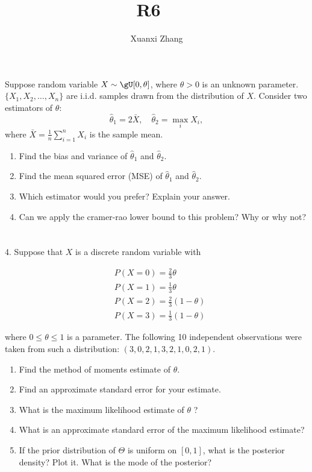 \documentclass{article}%
\title{\huge R6 \ \normalsize}
\author{Xuanxi Zhang}
\begin{document}
\maketitle
\section{}
Suppose random variable  $X\sim \gU[0,\theta]$, where $\theta>0$ is an unknown parameter. $\{X_1,X_2,\ldots,X_n\}$ are i.i.d. samples drawn from the distribution of $X$. Consider two estimators of $\theta$:
\[\hat{\theta}_1=2\bar{X},\quad \hat{\theta}_2=\max_i X_{i},\]
where $\bar{X}=\frac{1}{n}\sum_{i=1}^n X_i$ is the sample mean.

\begin{enumerate}
    \item Find the bias and variance of $\hat{\theta}_1$ and $\hat{\theta}_2$.
    \item Find the mean squared error (MSE) of $\hat{\theta}_1$ and $\hat{\theta}_2$.
    \item Which estimator would you prefer? Explain your answer.
    \item Can we apply the cramer-rao lower bound to this problem? Why or why not?
\end{enumerate}

\section{}
4. Suppose that $X$ is a discrete random variable with

$$
\begin{aligned}
&P(X=0)=\frac{2}{3} \theta \\
& P(X=1)=\frac{1}{3} \theta \\
& P(X=2)=\frac{2}{3}(1-\theta) \\
& P(X=3)=\frac{1}{3}(1-\theta)
\end{aligned}
$$

where $0 \leq \theta \leq 1$ is a parameter. The following 10 independent observations were taken from such a distribution: $(3,0,2,1,3,2,1,0,2,1)$.
\begin{enumerate}
  \item Find the method of moments estimate of $\theta$.
  \item Find an approximate standard error for your estimate.
  \item What is the maximum likelihood estimate of $\theta$ ?
  \item What is an approximate standard error of the maximum likelihood estimate?
  \item If the prior distribution of $\Theta$ is uniform on $[0,1]$, what is the posterior density? Plot it. What is the mode of the posterior?
\end{enumerate}
\end{document}
